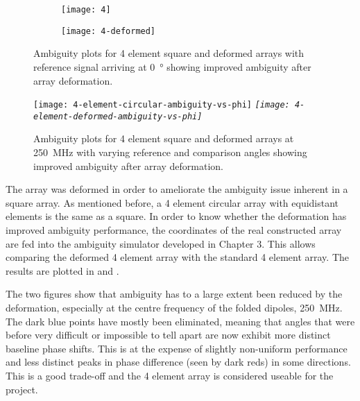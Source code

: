 \begin{figure}
  \centering
  \begin{subfigure}{\textwidth}
    \centering
    \texttt{[image: 4]}
  \end{subfigure}
  \begin{subfigure}{\textwidth}
    \centering
    \texttt{[image: 4-deformed]}
  \end{subfigure}
  \caption{Ambiguity plots for 4 element square and deformed arrays with reference signal arriving at \SI{0}{\degree} showing improved ambiguity after array deformation.}
  \label{fig:antenna-array:deformed-vs-normal-over-frequency}
\end{figure}

\begin{figure}
  \centering
  \texttt{[image: 4-element-circular-ambiguity-vs-phi]} \em \em
  \texttt{[image: 4-element-deformed-ambiguity-vs-phi]}
  \caption{Ambiguity plots for 4 element square and deformed arrays at \SI{250}{\mega\hertz} with varying reference and comparison angles showing improved ambiguity after array deformation.}
  \label{fig:antenna-array:deformed-vs-normal-over-angle}
\end{figure}

The array was deformed in order to ameliorate the ambiguity issue inherent in a square array. As mentioned before, a 4 element circular array with equidistant elements is the same as a square. In order to know whether the deformation has improved ambiguity performance, the coordinates of the real constructed array are fed into the ambiguity simulator developed in Chapter 3. This allows comparing the deformed 4 element array with the standard 4 element array. The results are plotted in  and .

The two figures show that ambiguity has to a large extent been reduced by the deformation, especially at the centre frequency of the folded dipoles, \SI{250}{\mega\hertz}. The dark blue points have mostly been eliminated, meaning that angles that were before very difficult or impossible to tell apart are now exhibit more distinct baseline phase shifts. This is at the expense of slightly non-uniform performance and less distinct peaks in phase difference (seen by dark reds) in some directions. This is a good trade-off and the 4 element array is considered useable for the project.\\

